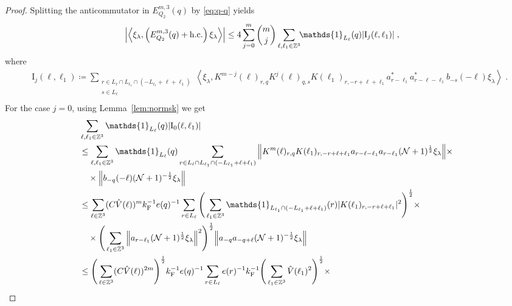 \documentclass[12pt,a4paper]{article}
\numberwithin{equation}{section}
\newcommand{\1}{\mathbb{I}}
\newcommand{\F}{\mathrm{F}}
\newcommand{\I}{\mathrm{I}}
\newcommand{\Zstar}{\mathbb{Z}^3} %
\newcommand{\Z}{\mathbb{Z}}
\newcommand{\NN}{\mathcal{N}}
\newcommand{\half}{\frac{1}{2}}
\newcommand{\eva}[1]{\left\langle #1 \right\rangle}
\theoremstyle{plain}
\theoremstyle{definition}
\theoremstyle{remark}
\theoremstyle{plain}
\theoremstyle{definition}
\theoremstyle{remark}
\begin{document}
\begin{proof}
Splitting the anticommutator in $ E^{m,3}_{Q_2}(q) $ by \eqref{eq:q-q} yields
\begin{equation} \label{eq:EQ2151}
\begin{aligned}
	&\abs{\eva{\xi_\lambda,\left(E^{m,3}_{Q_2}(q) + \mathrm{h.c.}\right) \xi_\lambda }}
	\le 4 \sum_{j=0}^m {{m}\choose j} \sum_{\ell,\ell_1 \in \Zstar}\!\! \mathds{1}_{L_\ell}(q) |\I_j(\ell, \ell_1)| \;,
	\end{aligned}
\end{equation}
where
\begin{equation}
\begin{aligned}
	& \I_j(\ell, \ell_1)
	\coloneq \sum_{\substack{r\in L_{\ell} \cap L_{\ell_1} \cap (-L_{\ell_1}+\ell+\ell_1)\\ s \in L_{\ell}}}
		\eva{\xi_\lambda, K^{m-j}(\ell)_{r,q} K^{j}(\ell)_{q,s} K(\ell_1)_{r,-r+\ell+\ell_1} a^*_{r-\ell_1} a^*_{r-\ell-\ell_1} b_{-s}(-\ell) \xi_\lambda} \;. \\
\end{aligned}
\end{equation}
For the case $j=0$, using Lemma~\ref{lem:normsk} we get
\begin{align}
	&\sum_{\ell,\ell_1 \in \Zstar} \mathds{1}_{L_\ell}(q) |\I_0(\ell, \ell_1)| \nonumber\\
	&\leq \sum_{\ell,\ell_1 \in \Zstar} \mathds{1}_{L_\ell}(q) \sum\limits_{\substack{r\in L_{\ell} \cap L_{\ell_1} \cap (-L_{\ell_1}+\ell+\ell_1)}}
		\norm{K^m(\ell)_{r,q} K(\ell_1)_{r,-r+\ell+\ell_1} a_{r-\ell-\ell_1} a_{r-\ell_1} (\NN+1)^\half \xi_\lambda} \times \nonumber\\
	&\quad \times \norm{ b_{-q}(-\ell) (\NN+1)^{-\half} \xi_\lambda}\nonumber\\
	&\leq \sum_{\ell \in \Zstar} (C \hat{V}(\ell))^m 
		k_{\F}^{-1} e(q)^{-1} \sum\limits_{r \in L_\ell}
		\Bigg( \sum_{\ell_1 \in \Zstar} \mathds{1}_{L_{\ell_1} \cap (-L_{\ell_1}+\ell+\ell_1) }(r) |K(\ell_1)_{r,-r+\ell+\ell_1}|^2 \Bigg)^{\half} \times \nonumber\\
	&\quad \times \Bigg( \sum_{\ell_1 \in \Z^3} \norm{a_{r-\ell_1} (\NN+1)^\half \xi_\lambda}^2 \Bigg)^{\half}
		\norm{ a_{-q} a_{-q+\ell} (\NN+1)^{-\half} \xi_\lambda}\nonumber\\
	&\leq \Bigg( \sum_{\ell \in \Zstar} (C \hat{V}(\ell))^{2m} \Bigg)^{\half} 
		k_{\F}^{-1} e(q)^{-1} \sum\limits_{r \in L_\ell} e(r)^{-1} k_{\F}^{-1}
		\Bigg( \sum_{\ell_1 \in \Zstar} \hat{V}(\ell_1)^2 \Bigg)^{\half} \times \nonumber\\

\end{align}
\end{proof}
\end{document}
